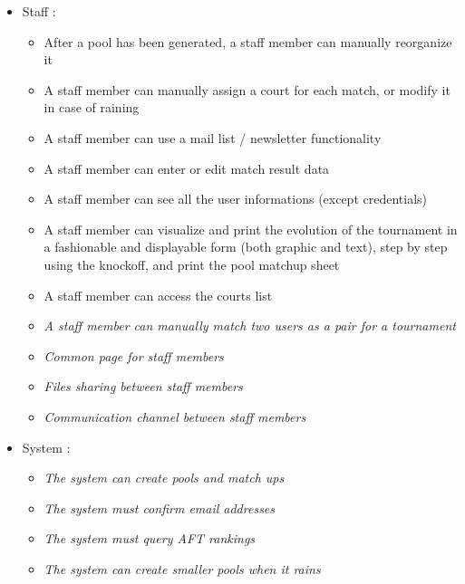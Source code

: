 \documentclass[a4paper, 12pt]{article}
\begin{document}
\begin{itemize}
\begin{itemize}
    \end{itemize}
    
    \item Staff : 
    
    \begin{itemize}
    	\item After a pool has been generated, a staff member can manually reorganize it
		\item A staff member can manually assign a court for each match, or modify it in case of raining
		\item A staff member can use a mail list / newsletter functionality
		\item A staff member can enter or edit match result data
		\item A staff member can see all the user informations (except credentials)
		\item A staff member can visualize and print the evolution of the tournament in a fashionable and displayable form (both graphic and text), step by step using the knockoff, and print the pool matchup sheet
		\item A staff member can access the courts list
		\item \textit{A staff member can manually match two users as a pair for a tournament}
		\item \textit{Common page for staff members}
		\item \textit{Files sharing between staff members}
		\item \textit{Communication channel between staff members}
    \end{itemize}
    
     \item System :   
     
    \begin{itemize}
    	\item \textit{The system can create pools and match ups}
		\item \textit{The system must confirm email addresses}
		\item \textit{The system must query AFT rankings}
		\item \textit{The system can create smaller pools when it rains}
    \end{itemize}
    
\end{itemize}
\end{document}
